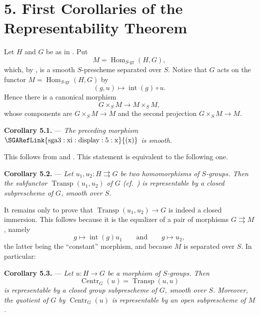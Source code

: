 
\section*{5. First Corollaries of the
Representability Theorem}

Let \(H\) and \(G\) be as in .  Put
\[
  M=\operatorname{Hom}_{S\text{-}\mathrm{gr}}(H,G),
\]
which, by , is a smooth \(S\)-prescheme separated over \(S\).
Notice that \(G\) acts on the functor
\(M=\operatorname{Hom}_{S\text{-}\mathrm{gr}}(H,G)\) by
\[
  (g,u)\longmapsto\operatorname{int}(g)\circ u.
\]
Hence there is a canonical morphism
\[
  \tag{x}
  G\times_S M\longrightarrow M\times_S M,
\]
whose components are 
\(G\times_S M\to M\) and the second projection
\(G\times_S M\to M\).

\medskip
\noindent{}\textbf{Corollary 5.1.} ---
\textit{The preceding morphism \(\mathrm{\SGARefLink{sga3:xi:display:5:x}{(x)}}\) is smooth.}

This follows from  and .  This statement is equivalent to the
following one.

\medskip
\noindent{}\textbf{Corollary 5.2.} ---
\textit{Let \(u_1,u_2:H\rightrightarrows G\) be two homomorphisms of
\(S\)-groups.  Then the subfunctor
\(\operatorname{Transp}(u_1,u_2)\) of \(G\) (cf.\ ) is
representable by a closed subprescheme of \(G\), smooth over \(S\).}

It remains only to prove that
\(\operatorname{Transp}(u_1,u_2)\to G\) is indeed a closed
immersion.  This follows because it is the equalizer of a pair of
morphisms \(G\rightrightarrows M\), namely
\[
  g\longmapsto\operatorname{int}(g)u_1
  \qquad\text{and}\qquad
  g\longmapsto u_2,
\]
the latter being the ``constant'' morphism, and because \(M\) is
separated over \(S\).  In particular:

\medskip
\noindent{}\textbf{Corollary 5.3.} ---
\textit{Let \(u:H\to G\) be a morphism of \(S\)-groups.  Then
\[
  \operatorname{Centr}_G(u)=\operatorname{Transp}(u,u)
\]
is representable by a closed group subprescheme of \(G\), smooth
over \(S\).  Moreover, the quotient of \(G\) by
\(\operatorname{Centr}_G(u)\) is representable by an open
subprescheme of \(M\).}

